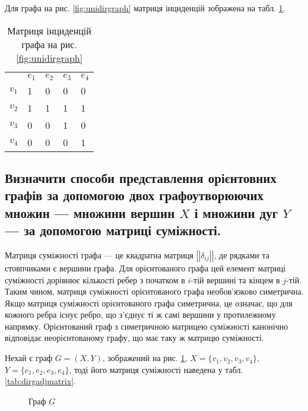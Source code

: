 \documentclass[a4paper,oneside,DIV=9,fontsize=12pt]{scrartcl}
\begin{document}
			Для графа на рис. \ref{fig:unidirgraph} матриця інциденцій зображена на табл. \ref{tab:unidirinctable}.
			
			\begin{table}[h!]
				\centering
				
				\begin{tabular}{lllll}
					\toprule
					      & $e_1$ & $e_2$ & $e_3$ & $e_4$\\
					$v_1$ & 1     & 0     & 0     & 0    \\
					$v_2$ & 1     & 1     & 1     & 1    \\
					$v_3$ & 0     & 0     & 1     & 0    \\
					$v_4$ & 0     & 0     & 0     & 1    \\
					\bottomrule
				\end{tabular}
				
				\caption{Матриця інциденцій графа на рис. \ref{fig:unidirgraph}}
				\label{tab:unidirinctable}
			\end{table}
			
		\subsection{Визначити способи представлення орієнтовних графів за допомогою двох графоутворюючих множин --- множини вершин $X$ і множини дуг $Y$ --- за допомогою матриці суміжності.}
			Матриця суміжності графа --- це квадратна матриця $\left|\left|\delta_{ij}\right|\right|$, де рядками та стовпчиками є вершини графа. Для орієнтованого графа цей елемент матриці суміжності дорівнює кількості ребер з початком в $i$-тій вершині та кінцем в $j$-тій. Таким чином, матриця суміжності орієнтованого графа необов'язково симетрична. Якщо матриця суміжності орієнтованого графа симетрична, це означає, що для кожного ребра існує ребро, що з'єднує ті ж самі вершини у протилежному напрямку. Орієнтований граф з симетричною матрицею суміжності канонічно відповідає неорієнтованому графу, що має таку ж матрицю суміжності.
			
			Нехай є граф $G = (X, Y)$, зображений на рис. \ref{fig:dirgraph}, $X = \{v_1, v_2, v_3, v_4\}$, $Y = \{e_1, e_2, e_3, e_4\}$, тоді його матриця суміжності наведена у табл. \ref{tab:dirgadjmatrix}.
			
			\begin{figure}[h!]
				\centering
				
				
				\caption{Граф $G$}
				\label{fig:dirgraph}
			\end{figure}
			
\end{document}
